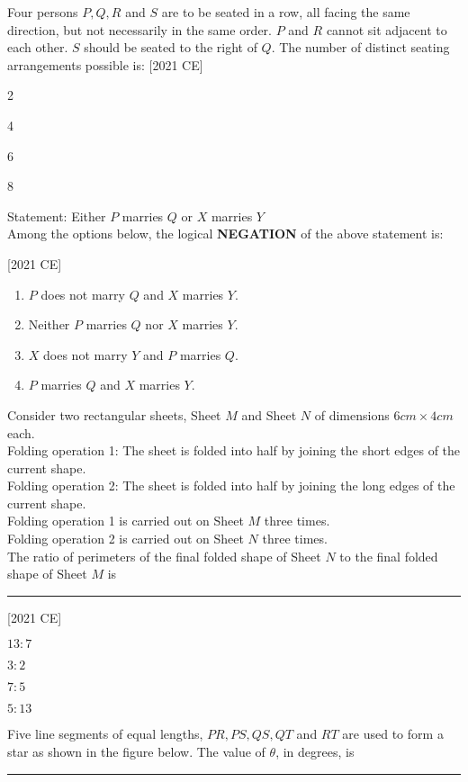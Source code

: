 \item Four persons $P, Q, R$ and $S$ are to be seated in a row, all facing the same
direction, but not necessarily in the same order. $P$ and $R$ cannot sit adjacent
to each other. $S$ should be seated to the right of $Q$. The number of distinct
seating arrangements possible is: \hfill [2021 CE]
\begin{enumerate}
    \begin{multicols}{4}
        \item 2
        \item 4
        \item 6
        \item 8
    \end{multicols}
\end{enumerate}
\item Statement: Either $P$ marries $Q$ or $X$ marries $Y$\\
Among the options below, the logical \textbf{NEGATION} of the above statement is:

\hfill [2021 CE]
\begin{enumerate}
    \item $P$ does not marry $Q$ and $X$ marries $Y$.
    \item Neither $P$ marries $Q$ nor $X$ marries $Y$.
    \item $X$ does not marry $Y$ and $P$ marries $Q$.
    \item $P$ marries $Q$ and $X$ marries $Y$.
\end{enumerate}
\item Consider two rectangular sheets, Sheet $M$ and Sheet $N $ of dimensions
$6 cm \times 4 cm $ each.\\
Folding operation 1: The sheet is folded into half by joining the short edges of
the current shape. \\
Folding operation 2: The sheet is folded into half by joining the long edges of
the current shape.\\
Folding operation 1 is carried out on Sheet $M$ three times.\\
Folding operation 2 is carried out on Sheet $N$ three times. \\
The ratio of perimeters of the final folded shape of Sheet $N$ to the final folded
shape of Sheet $M$ is \rule{2cm}{0.4pt} \hfill [2021 CE]
\begin{enumerate}
    \begin{multicols}{2}
        \item $13 : 7$ \\
        \item $3 :2$ \\
        \item $7 : 5$ \\
        \item $5 : 13$
    \end{multicols}
\end{enumerate}
\item Five line segments of equal lengths, $PR, PS, QS, QT$ and $RT$ are used to
form a star as shown in the figure below.
The value of $\theta$, in degrees, is \rule{2cm}{0.4pt}

